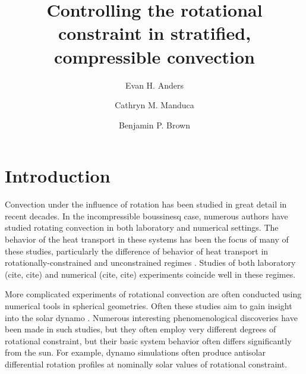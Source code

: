 \documentclass[twocolumn, amsmath, amsfonts, amssymb]{aastex62}
\begin{document}
\title{Controlling the rotational constraint in stratified, compressible convection}


\author{Evan H. Anders}
\author{Cathryn M. Manduca}
\author{Benjamin P. Brown}


\begin{abstract}
\end{abstract}


\section{Introduction}
\label{sec:intro}
Convection under the influence of rotation has been studied in great detail in
recent decades. In the incompressible boussinesq case, numerous authors have
studied rotating convection in both laboratory and numerical settings. The
behavior of the heat transport in these systems has been the focus of many
of these studies, particularly the difference of behavior of heat transport
in rotationally-constrained and unconstrained regimes 
\citep{king&all2009, zhong&all2009, stevens&all2009, julien&all2012}. 
Studies of both laboratory (cite, cite) and numerical (cite, cite) experiments
coincide well in these regimes.

More complicated experiments of rotational convection are often conducted
using numerical tools in spherical geometries. Often these studies aim to
gain insight into the solar dynamo \citep{glatzmaier&gilman1982, busse2002, brown&all2008,
brown&all2010, brown&all2011, augustson&all2012, guerrero&all2013, kapyla&all2014}.
Numerous interesting phenomenological discoveries have been made in such studies,
but they often employ very different degrees of rotational constraint, but their
basic system behavior often differs significantly from the sun. For example, 
dynamo simulations often produce antisolar differential rotation profiles at
nominally solar values of rotational constraint.
\end{document}
